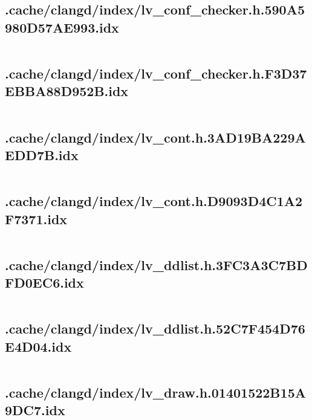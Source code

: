 \subsection{.cache/clangd/index/lv_conf_checker.h.590A5980D57AE993.idx}
\inputminted[linenos,tabsize=2,breaklines, breakanywhere]{c}{lv_conf_checker.h.590A5980D57AE993.idx}
\pagebreak

\subsection{.cache/clangd/index/lv_conf_checker.h.F3D37EBBA88D952B.idx}
\inputminted[linenos,tabsize=2,breaklines, breakanywhere]{c}{lv_conf_checker.h.F3D37EBBA88D952B.idx}
\pagebreak

\subsection{.cache/clangd/index/lv_cont.h.3AD19BA229AEDD7B.idx}
\inputminted[linenos,tabsize=2,breaklines, breakanywhere]{c}{lv_cont.h.3AD19BA229AEDD7B.idx}
\pagebreak

\subsection{.cache/clangd/index/lv_cont.h.D9093D4C1A2F7371.idx}
\inputminted[linenos,tabsize=2,breaklines, breakanywhere]{c}{lv_cont.h.D9093D4C1A2F7371.idx}
\pagebreak

\subsection{.cache/clangd/index/lv_ddlist.h.3FC3A3C7BDFD0EC6.idx}
\inputminted[linenos,tabsize=2,breaklines, breakanywhere]{c}{lv_ddlist.h.3FC3A3C7BDFD0EC6.idx}
\pagebreak

\subsection{.cache/clangd/index/lv_ddlist.h.52C7F454D76E4D04.idx}
\inputminted[linenos,tabsize=2,breaklines, breakanywhere]{c}{lv_ddlist.h.52C7F454D76E4D04.idx}
\pagebreak

\subsection{.cache/clangd/index/lv_draw.h.01401522B15A9DC7.idx}
\inputminted[linenos,tabsize=2,breaklines, breakanywhere]{c}{lv_draw.h.01401522B15A9DC7.idx}
\pagebreak

